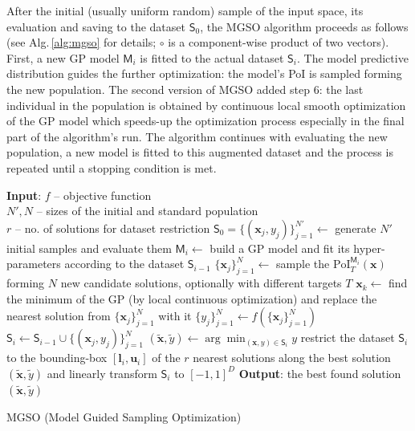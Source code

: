 \documentclass{itatnew}
\newcommand{\xx}{\mathrm{\mathbf{x}}}
\begin{document}
After the initial (usually uniform random) sample of the input space, its evaluation and saving to the dataset $\mathsf{S}_0$, the MGSO algorithm proceeds as follows (see Alg.\,\ref{alg:mgso} for details; $\circ$ is a component-wise product of two vectors). First, a new GP model $\mathsf{M}_i$ is fitted to the actual dataset $\mathsf{S}_i$. The model predictive distribution guides the further optimization: the model's PoI is sampled forming the new population. The second version of MGSO added step 6: the last individual in the population is obtained by continuous local smooth optimization of the GP model which speeds-up the optimization process especially in the final part of the algorithm's run. The algorithm continues with evaluating the new population, a new model is fitted to this augmented dataset and the process is repeated until a stopping condition is met.

\begin{algorithm}[t]
\begin{algorithmic}[1]
{\small
  \STATE \textbf{Input}: $f$ -- objective function \\
      \quad $N', N$ -- sizes of the initial and standard population \\
      \quad $r$ -- no. of solutions for dataset restriction
  \STATE $\mathsf{S}_0 = \{(\xx_j, y_j)\}_{j=1}^{N'} \leftarrow$ generate $N'$ initial samples 
      and evaluate them %
    \STATE $\mathsf{M}_i \leftarrow$ build a GP model and fit its hyper-parameters
        according to the dataset $\mathsf{S}_{i-1}$
    \STATE $\{\xx_j\}_{j=1}^{N}  \leftarrow$ sample the $\textrm{PoI}_T^{\mathsf{M}_i}(\xx)$ 
        forming $N$ new candidate solutions, optionally with different targets $T$
    \STATE $\xx_k \leftarrow$ find the minimum of the GP (by local continuous optimization) and replace the nearest solution from $\{\xx_j\}_{j=1}^{N}$ with it
    \STATE $\{y_j\}_{j=1}^N \leftarrow f(\{\xx_j\}_{j=1}^N)$  \hspace{\fill}   
    \STATE $\mathsf{S}_i \leftarrow \mathsf{S}_{i-1} \cup \{(\xx_j, y_j)\}_{j=1}^N$  \hspace{\fill}   
    \STATE $(\tilde{\xx}, \tilde{y}) \leftarrow \arg \min_{(\xx,y) \in \mathsf{S}_i} y$  \hspace{\fill}  
    \STATE restrict the dataset $\mathsf{S}_i$ to the bounding-box $[\mathbf{l}_i,\mathbf{u}_i]$ of the $r$ nearest solutions along the best solution $(\tilde{\xx},\tilde{y})$ and linearly transform $\mathsf{S}_i$ to $[-1, 1]^D$
    \ENDIF
  \ENDWHILE
  \STATE \textbf{Output}: the best found solution $(\tilde{\xx}, \tilde{y})$
}
\end{algorithmic}
\caption{MGSO (Model Guided Sampling Optimization)}
\label{alg:mgso}
\end{algorithm}
\end{document}
